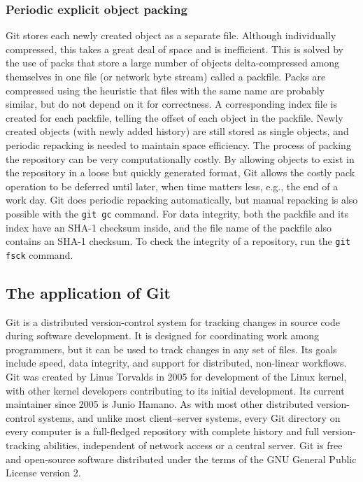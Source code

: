 \documentclass[a4paper]{report}
\begin{document}
\subsubsection{Periodic explicit object packing}
Git stores each newly created object as a separate file. Although individually compressed, this takes a great deal of space and is inefficient. This is solved by the use of packs that store a large number of objects delta-compressed among themselves in one file (or network byte stream) called a packfile. Packs are compressed using the heuristic that files with the same name are probably similar, but do not depend on it for correctness. A corresponding index file is created for each packfile, telling the offset of each object in the packfile. Newly created objects (with newly added history) are still stored as single objects, and periodic repacking is needed to maintain space efficiency. The process of packing the repository can be very computationally costly. By allowing objects to exist in the repository in a loose but quickly generated format, Git allows the costly pack operation to be deferred until later, when time matters less, e.g., the end of a work day. Git does periodic repacking automatically, but manual repacking is also possible with the \lstinline !git gc! command. For data integrity, both the packfile and its index have an SHA-1 checksum inside, and the file name of the packfile also contains an SHA-1 checksum. To check the integrity of a repository, run the \lstinline!git fsck! command.
\subsection{The application of Git}

Git is a distributed version-control system for tracking changes in source code during software development. It is designed for coordinating work among programmers, but it can be used to track changes in any set of files. Its goals include speed, data integrity, and support for distributed, non-linear workflows.
Git was created by Linus Torvalds in 2005 for development of the Linux kernel, with other kernel developers contributing to its initial development. Its current maintainer since 2005 is Junio Hamano.
As with most other distributed version-control systems, and unlike most client–server systems, every Git directory on every computer is a full-fledged repository with complete history and full version-tracking abilities, independent of network access or a central server.
Git is free and open-source software distributed under the terms of the GNU General Public License version 2.
\end{document}
